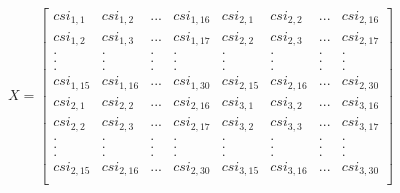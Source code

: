$
X
=
\begin{bmatrix}
csi_{1,1} & csi_{1,2} & ... & csi_{1, 16} & csi_{2, 1} & csi_{2, 2} & ... & csi_{2, 16} \\ 
csi_{1,2} & csi_{1,3} & ... & csi_{1, 17} & csi_{2, 2} & csi_{2, 3} & ... & csi_{2, 17} \\ 
. & . & . & . & . & . & . & . \\
. & . & . & . & . & . & . & . \\
. & . & . & . & . & . & . & . \\
csi_{1,15} & csi_{1,16} & ... & csi_{1, 30} & csi_{2, 15} & csi_{2, 16} & ... & csi_{2, 30} \\ 
csi_{2,1} & csi_{2,2} & ... & csi_{2, 16} & csi_{3, 1} & csi_{3, 2} & ... & csi_{3, 16} \\
csi_{2,2} & csi_{2,3} & ... & csi_{2, 17} & csi_{3, 2} & csi_{3, 3} & ... & csi_{3, 17} \\  
. & . & . & . & . & . & . & . \\
. & . & . & . & . & . & . & . \\
. & . & . & . & . & . & . & . \\
csi_{2,15} & csi_{2,16} & ... & csi_{2, 30} & csi_{3, 15} & csi_{3, 16} & ... & csi_{3, 30} \\ 
\end{bmatrix}$